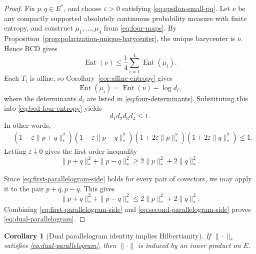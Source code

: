 \documentclass[a4paper,11pt]{article}
\numberwithin{equation}{section}
\newtheorem{corollary}[theorem]{Corollary}
\newcommand{\Ent}{\operatorname{Ent}}
\begin{document}
	\begin{proof}
		Fix \(p,q\in E^*\), and choose \(\varepsilon>0\) satisfying
		\eqref{eq:epsilon-small-pq}. Let \(\nu\) be any compactly supported absolutely continuous
		probability measure with finite entropy, and construct \(\mu_1,\dots,\mu_4\) from
		\eqref{eq:four-maps}. By Proposition~\ref{prop:polarization-unique-barycenter}, the unique
		barycenter is \(\nu\). Hence BCD gives
		\begin{equation}\label{eq:bcd-four-entropy}
			\Ent(\nu)
			\le \frac14\sum_{i=1}^4\Ent(\mu_i).
		\end{equation}
		Each \(T_i\) is affine, so Corollary~\ref{cor:affine-entropy} gives
		\[
		\Ent(\mu_i)=\Ent(\nu)-\log d_i,
		\]
		where the determinants \(d_i\) are listed in \eqref{eq:four-determinants}. Substituting
		this into \eqref{eq:bcd-four-entropy} yields
		\begin{equation}\label{eq:product-le-one-first}
			d_1d_2d_3d_4\le1.
		\end{equation}
		In other words,
		\begin{equation}\label{eq:first-product-expanded}
			\begin{aligned}
				&(1-\varepsilon\|p+q\|_*^2)
				(1-\varepsilon\|p-q\|_*^2)
				(1+2\varepsilon\|p\|_*^2)
				(1+2\varepsilon\|q\|_*^2)
				\le1.
			\end{aligned}
		\end{equation}
		Letting \(\varepsilon\downarrow0\) gives the first-order inequality
		\begin{equation}\label{eq:first-parallelogram-side}
			\|p+q\|_*^2+\|p-q\|_*^2
			\ge 2\|p\|_*^2+2\|q\|_*^2.
		\end{equation}
		
		Since \eqref{eq:first-parallelogram-side} holds for every pair of covectors, we may
		apply it to the pair \(p+q,p-q\). This gives
		\begin{equation}\label{eq:second-parallelogram-side}
			\|p+q\|_*^2+\|p-q\|_*^2
			\le 2\|p\|_*^2+2\|q\|_*^2.
		\end{equation}
		Combining \eqref{eq:first-parallelogram-side} and \eqref{eq:second-parallelogram-side}
		proves \eqref{eq:dual-parallelogram}.
	\end{proof}
	
	
	\begin{corollary}[Dual parallelogram identity implies Hilbertianity]
		\label{cor:hilbertianity}
		If \(\|\cdot\|_*\) satisfies \eqref{eq:dual-parallelogram}, then \(\|\cdot\|\) is induced
		by an inner product on \(E\).
	\end{corollary}
	
\end{document}
